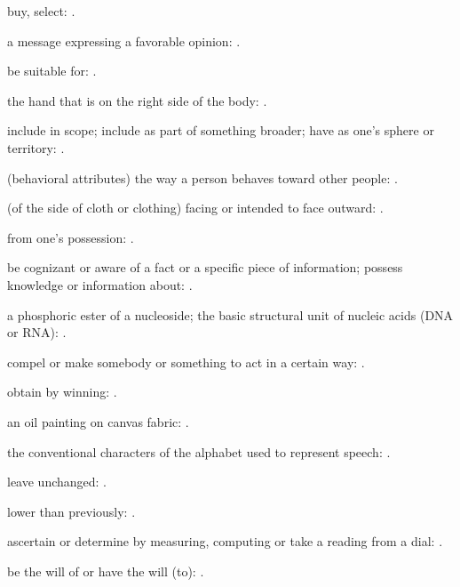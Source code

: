   buy, select: .

  a message expressing a favorable opinion:   .

  be suitable for: .

  the hand that is on the right side of the body:   .

  include in scope; include as part of something broader; have as one's sphere or territory:   .

  (behavioral attributes) the way a person behaves toward other people:   .

  (of the side of cloth or clothing) facing or intended to face outward: .

  from one's possession:   .

  be cognizant or aware of a fact or a specific piece of information; possess knowledge or information about:   .

  a phosphoric ester of a nucleoside; the basic structural unit of nucleic acids (DNA or RNA):   .

  compel or make somebody or something to act in a certain way: .

  obtain by winning: .

  an oil painting on canvas fabric:   .

  the conventional characters of the alphabet used to represent speech:   .

  leave unchanged: .

  lower than previously:   .

  ascertain or determine by measuring, computing or take a reading from a dial: .

  be the will of or have the will (to): .


